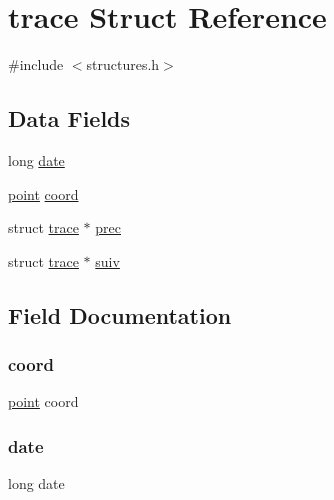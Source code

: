 \hypertarget{structtrace}{}\section{trace Struct Reference}
\label{structtrace}


{\ttfamily \#include $<$structures.\+h$>$}

\subsection*{Data Fields}
\begin{DoxyCompactItemize}
\item 
long \hyperlink{structtrace_abb80b058118845508dbd87b3bb6600be}{date}
\item 
\hyperlink{structpoint}{point} \hyperlink{structtrace_a16be187ac405f3bb61930a342b444253}{coord}
\item 
struct \hyperlink{structtrace}{trace} $\ast$ \hyperlink{structtrace_a1967dba5ed4900e2f554b2442863e69e}{prec}
\item 
struct \hyperlink{structtrace}{trace} $\ast$ \hyperlink{structtrace_ab7909a2cccd6f40ca9499c850c9c948c}{suiv}
\end{DoxyCompactItemize}


\subsection{Field Documentation}
\hypertarget{structtrace_a16be187ac405f3bb61930a342b444253}{}\label{structtrace_a16be187ac405f3bb61930a342b444253} 
\subsubsection{\texorpdfstring{coord}{coord}}
{\footnotesize\ttfamily \hyperlink{structpoint}{point} coord}

\hypertarget{structtrace_abb80b058118845508dbd87b3bb6600be}{}\label{structtrace_abb80b058118845508dbd87b3bb6600be} 
\subsubsection{\texorpdfstring{date}{date}}
{\footnotesize\ttfamily long date}

\hypertarget{structtrace_a1967dba5ed4900e2f554b2442863e69e}{}\label{structtrace_a1967dba5ed4900e2f554b2442863e69e} 
